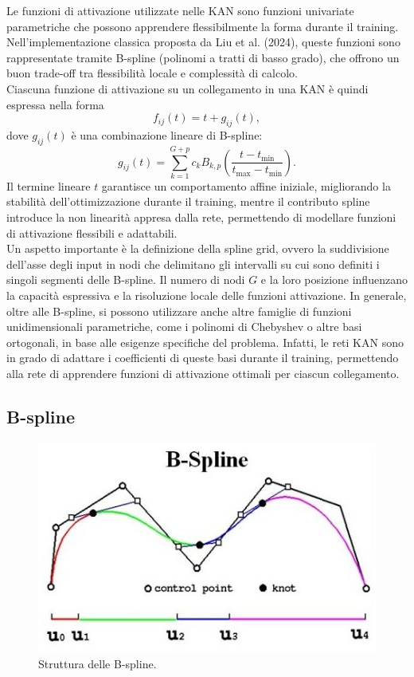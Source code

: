 \documentclass[a4paper,12pt]{report}
\begin{document}
	Le funzioni di attivazione utilizzate nelle KAN sono funzioni univariate parametriche che possono apprendere flessibilmente la forma durante il training. Nell’implementazione classica proposta da Liu et al. (2024), queste funzioni sono rappresentate tramite B-spline (polinomi a tratti di basso grado), che offrono un buon trade-off tra flessibilità locale e complessità di calcolo. \\
	
	Ciascuna funzione di attivazione su un collegamento in una KAN è quindi espressa nella forma
	\[
	f_{ij}(t) = t + g_{ij}(t),
	\]
	dove \(g_{ij}(t)\) è una combinazione lineare di B-spline:
	\[
	g_{ij}(t) = \sum_{k=1}^{G+p} c_k B_{k,p}\left(\frac{t - t_{\min}}{t_{\max} - t_{\min}}\right).
	\]
	Il termine lineare \(t\) garantisce un comportamento affine iniziale, migliorando la stabilità dell'ottimizzazione durante il training, mentre il contributo spline introduce la non linearità appresa dalla rete, permettendo di modellare funzioni di attivazione flessibili e adattabili. \\
	Un aspetto importante è la definizione della spline grid, ovvero la suddivisione dell'asse degli input in nodi che delimitano gli intervalli su cui sono definiti i singoli segmenti delle B-spline. Il numero di nodi \(G\) e la loro posizione influenzano la capacità espressiva e la risoluzione locale delle funzioni attivazione. In generale, oltre alle B-spline, si possono utilizzare anche altre famiglie di funzioni unidimensionali parametriche, come i polinomi di Chebyshev o altre basi ortogonali, in base alle esigenze specifiche del problema. Infatti, le reti KAN sono in grado di adattare i coefficienti di queste basi durante il training, permettendo alla rete di apprendere funzioni di attivazione ottimali per ciascun collegamento.
	
	\subsection{B-spline}
	
	\begin{figure}[H]
		\centering
		\includegraphics[width=1.0\textwidth]{img/b_spline.jpg}
		\caption{Struttura delle B-spline.}
	\end{figure}
	
\end{document}
